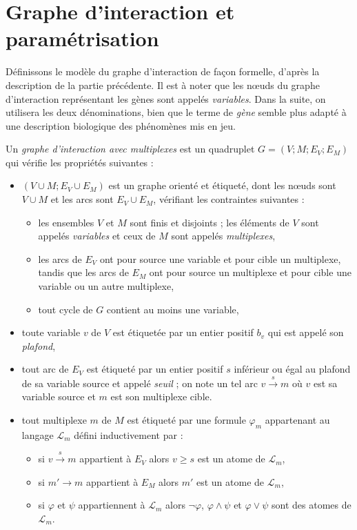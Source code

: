 \section{Graphe d'interaction et paramétrisation}
Définissons le modèle du graphe d'interaction de façon formelle, d'après la description de la partie précédente. Il est à noter que les n\oe uds du graphe d'interaction représentant les gènes sont appelés \emph{variables}. Dans la suite, on utilisera les deux dénominations, bien que le terme de \emph{gène} semble plus adapté à une description biologique des phénomènes mis en jeu.
\begin{definition}
Un \emph{graphe d'interaction avec multiplexes} est un quadruplet $G = (V ; M ; E_V ; E_M)$ qui vérifie les propriétés suivantes :
\begin{itemize}
  \item $(V \cup M ; E_V \cup E_M)$ est un graphe orienté et étiqueté, dont les n\oe uds sont $V \cup M$ et les arcs sont $E_V \cup E_M$, vérifiant les contraintes suivantes :
  \begin{itemize}
    \item les ensembles $V$ et $M$ sont finis et disjoints ; les éléments de $V$ sont appelés \emph{variables} et ceux de $M$ sont appelés \emph{multiplexes},
    \item les arcs de $E_V$ ont pour source une variable et pour cible un multiplexe, tandis que les arcs de $E_M$ ont pour source un multiplexe et pour cible une variable ou un autre multiplexe,
    \item tout cycle de $G$ contient au moins une variable,
  \end{itemize}
  \item toute variable $v$ de $V$ est étiquetée par un entier positif $b_v$ qui est appelé son \emph{plafond},
  \item tout arc de $E_V$ est étiqueté par un entier positif $s$ inférieur ou égal au plafond de sa variable source et appelé \emph{seuil} ; on note un tel arc $v \xrightarrow{s} m$ où $v$ est sa variable source et $m$ est son multiplexe cible.
  \item tout multiplexe $m$ de $M$ est étiqueté par une formule $\varphi_m$ appartenant au langage $\mathcal{L}_m$ défini inductivement par :
  \begin{itemize}
    \item si $v \xrightarrow{s} m$ appartient à $E_V$ alors $v \geq s$ est un atome de $\mathcal{L}_m$,
    \item si $m' \xrightarrow{} m$ appartient à $E_M$ alors $m'$ est un atome de $\mathcal{L}_m$,
    \item si $\varphi$ et $\psi$ appartiennent à $\mathcal{L}_m$ alors $\neg \varphi$, $\varphi \wedge \psi$ et $\varphi \vee \psi$ sont des atomes de $\mathcal{L}_m$.
  \end{itemize}
\end{itemize}
\end{definition}
